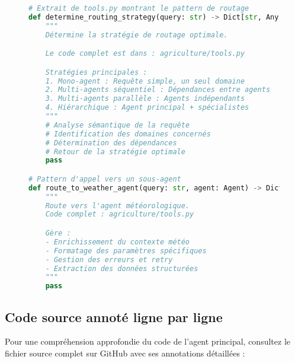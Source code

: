 \begin{figure}[H]
\centering
\begin{lstlisting}[language=Python, caption=Logique de routage intelligente (extrait)]
# Extrait de tools.py montrant le pattern de routage
def determine_routing_strategy(query: str) -> Dict[str, Any]:
    """
    Détermine la stratégie de routage optimale.

    Le code complet est dans : agriculture/tools.py

    Stratégies principales :
    1. Mono-agent : Requête simple, un seul domaine
    2. Multi-agents séquentiel : Dépendances entre agents
    3. Multi-agents parallèle : Agents indépendants
    4. Hiérarchique : Agent principal + spécialistes
    """
    # Analyse sémantique de la requête
    # Identification des domaines concernés
    # Détermination des dépendances
    # Retour de la stratégie optimale
    pass

# Pattern d'appel vers un sous-agent
def route_to_weather_agent(query: str, agent: Agent) -> Dict[str, Any]:
    """
    Route vers l'agent météorologique.
    Code complet : agriculture/tools.py

    Gère :
    - Enrichissement du contexte météo
    - Formatage des paramètres spécifiques
    - Gestion des erreurs et retry
    - Extraction des données structurées
    """
    pass
\end{lstlisting}
\end{figure}

\subsection{Code source annoté ligne par ligne}

Pour une compréhension approfondie du code de l'agent principal, consultez le fichier source complet sur GitHub avec ses annotations détaillées :

